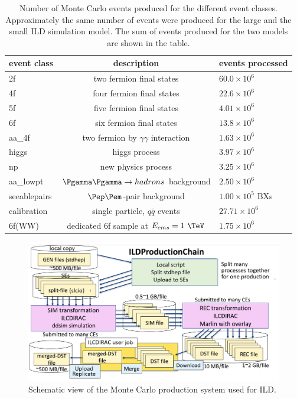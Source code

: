 \begin{table}[htbp]
\renewcommand{\arraystretch}{1.25}

\centering\small
\begin{tabular}{lcl}
\hline
 event class  &  description & events processed \\ 
\hline 
2f &   two fermion  final states &  $60.0 \times 10^6$ \\
4f &  four fermion final states & $22.6 \times 10^6$ \\
5f &  five fermion final states & $4.01 \times 10^6$ \\
6f &   six fermion  final states &  $13.8 \times 10^6$ \\
aa\_4f & two fermion by $\gamma\gamma$ interaction & $1.63 \times 10^6$ \\
higgs & higgs process & $3.97 \times 10^6$ \\
np & new physics process & $3.25 \times 10^6$ \\
\hline
aa\_lowpt &  $\Pgamma \Pgamma \to hadrons$ background  &  $2.50 \times 10^6$ \\
seeablepairs &   $\Pep\Pem$-pair background    &  $1.00\times 10^5$ BXs \\
calibration & single particle, $q\bar{q}$ events & $27.71\times 10^6$ \\
\hline
6f(WW) &  dedicated 6f sample at $E_{cms}=1~\TeV$ &  $1.75 \times 10^6$ \\

\hline
\end{tabular}
\caption{\label{tab:mcprod_evtnum} Number of Monte Carlo events produced for the different event classes. 
Approximately the same number of events were produced for the large and the small ILD simulation model.
The sum of events produced for the two models are shown in the table.} 
\end{table}



\begin{figure}[b!]
\includegraphics[width=1.0\hsize]{Modelling/fig/ilcdirac_ild_scheme.png}
\caption{\label{fig:sim_ild_mcprod} Schematic view of the Monte Carlo production system used for ILD.}
\end{figure}

